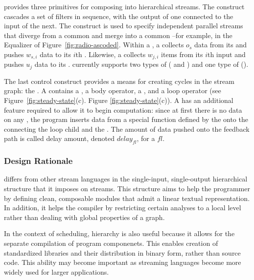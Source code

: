 
{\StreamIt} provides three primitives for composing {\filters} into
hierarchical streams.  The {\pipeline} construct cascades a set of
filters in sequence, with the output of one connected to the input of
the next.  The {\splitjoin} construct is used to specify independent
parallel streams that diverge from a common {\splitter} and merge into
a common {\joiner}--for example, in the Equalizer of
Figure~\ref{fig:radio-ascoded}.  Within a {\splitjoin}, a {\splitter}
collects $o_s$ data from its {\Input} {\Channel} and pushes $w_{s,i}$
data to its $i$th {\Output} {\Channel}.  Likewise, a {\joiner}
collects $w_{j,i}$ items from its $i$th input {\Input}{\Channel} and
pushes $u_j$ data to its {\Output}{\Channel}.  {\StreamIt} currently
supports two types of {\splitters} ({\duplicate} and {\roundrobin})
and one type of {\joiner} (\roundrobin).

The last control construct provides a means for creating cycles in the
stream graph: the {\feedbackloop}. A {\feedbackloop} contains a
{\joiner}, a body operator, a {\splitter}, and a loop operator (see
Figure~\ref{fig:steady-state}(c).  Figure \ref{fig:steady-state}(c)).
A {\feedbackloop} has an additional feature required to allow it to
begin computation: since at first there is no data on any {\Channels},
the program inserts data from a special function defined by the
{\feedbackloop} onto the {\Channel} connecting the loop child and the
{\joiner}. The amount of data pushed onto the feedback path is called
delay amount, denoted $delay_{fl}$, for a {\feedbackloop} $fl$.

\subsubsection{Design Rationale}

{\StreamIt} differs from other stream languages in the single-input,
single-output hierarchical structure that it imposes on streams.  This
structure aims to help the programmer by defining clean, composable
modules that admit a linear textual representation.  In addition, it
helps the compiler by restricting certain analyses to a local level
rather than dealing with global properties of a graph.

In the context of scheduling, hierarchy is also useful because it
allows for the separate compilation of program componenets.  This
enables creation of standardized libraries and their distribution in
binary form, rather than source code.  This ability may become
important as streaming languages become more widely used for larger
applications.

